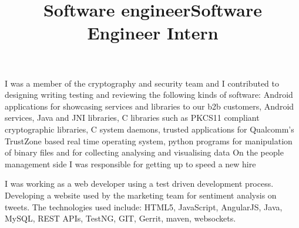 \begin{resume}
        \title{Software engineer}
        \begin{position}
            I was a member of the cryptography and security team and
            I contributed to designing writing testing and reviewing the following kinds of software:
            Android applications for showcasing services and libraries to our b2b customers,
            Android services,
            Java and JNI libraries,
            C libraries such as PKCS11 compliant cryptographic libraries,
            C system daemons,
            trusted applications for Qualcomm's TrustZone based real time operating system,
            python programs for manipulation of binary files and for collecting analysing and visualising data
            On the people management side I was responsible for getting up to speed a new hire
        \end{position}
        \title{Software Engineer Intern}
        \begin{position}
            I was working as a web developer using a test driven development process.
            Developing a website used by the marketing team for sentiment analysis on tweets.
            The technologies used include: HTML5, JavaScript, AngularJS, Java, MySQL, REST APIs, TestNG, GIT, Gerrit, maven, websockets.
        \end{position}
%


\end{resume}

